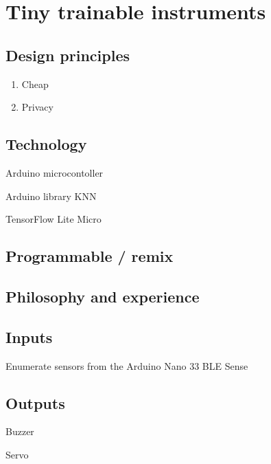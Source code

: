 \chapter{Tiny trainable instruments}

\section{Design principles}

\begin{enumerate}
  \item Cheap
  \item Privacy
\end{enumerate}

\section{Technology}

Arduino microcontoller

Arduino library KNN

TensorFlow Lite Micro

\section{Programmable / remix}

\section{Philosophy and experience}


\section{Inputs}

Enumerate sensors from the Arduino Nano 33 BLE Sense

\section{Outputs}

Buzzer

Servo
